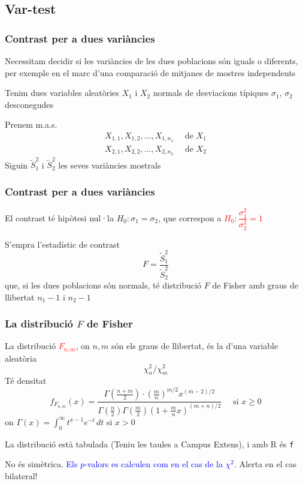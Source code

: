 \documentclass[12pt,t]{beamer}
\newcommand{\red}[1]{\textcolor{red}{#1}}
\newcommand{\blue}[1]{\textcolor{blue}{#1}}
\renewcommand{\emph}[1]{{\color{red}#1}}
\renewcommand{\geq}{\geqslant}
\theoremstyle{plain}
\theoremstyle{definition}
\begin{document}
\subsection{Var-test}
\begin{frame}
\frametitle{Contrast per a dues variàncies}

Necessitam decidir si les variàncies de les dues poblacions són iguals o diferents, per exemple en el marc d'una comparació de mitjanes de mostres independents
\medskip


Tenim dues variables aleatòries $X_1$ i $X_2$ \emph{normals} de desviacions típiques $\sigma_1$, $\sigma_2$ desconegudes
\medskip

Prenem m.a.s. 
$$
\begin{array}{l}
X_{1,1}, X_{1,2},\ldots, X_{1,n_1}\quad\mbox{ de }X_1\\
X_{2,1}, X_{2,2},\ldots, X_{2,n_2}\quad\mbox{ de }X_2
\end{array}
$$
Siguin $\widetilde{S}_1^2$ i $\widetilde{S}_2^2$  les seves variàncies mostrals
\end{frame}


\begin{frame}
\frametitle{Contrast per a dues variàncies}


El contrast té hipòtesi nul·la $H_0: \sigma_1=\sigma_2$, que correspon a
\red{$H_0:\dfrac{\sigma^2_1}{\sigma_2^2}=1$}
\medskip

S'empra l'estadístic de contrast
$$
F=\frac{\widetilde{S}_1^2}{\widetilde{S}_2^2}
$$
que, si les dues poblacions són normals, té distribució \emph{$F$ de Fisher} amb graus de llibertat $n_1-1$ i $n_2-1$
\end{frame}

\begin{frame}
\frametitle{La distribució $F$ de Fisher}

La distribució \red{$F_{n,m}$}, on $n,m$ són els \emph{graus de llibertat},
és la  d'una variable aleatòria
$$
{\chi_{n}^2}/{\chi_m^2}
$$
Té densitat
$$
f_{F_{n,m}}(x)=\frac{\Gamma(\frac{n+m}{2})\cdot(\frac{m}{n})^{m/2}x^{(m-2)/2}}%
{\Gamma(\frac{n}{2})\Gamma(\frac{m}{2})(1+\frac{m}{n}x)^{(m+n)/2}}
\quad\mbox{ si $x\geq 0$}
$$
on $\Gamma(x)=\int_{0}^{\infty} t^{x-1}e^{-t}\, dt$ si $x> 0$
\bigskip


La distribució està tabulada (\emph{Teniu les taules a Campus Extens}), i amb R és \texttt{f} 
\medskip

No és simètrica. \blue{Els $p$-valors es calculen com en el cas de la $\chi^2$.} Alerta en el cas bilateral!

\end{frame}
\end{document}
